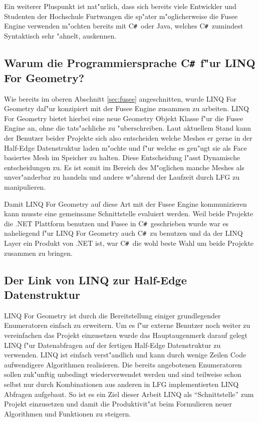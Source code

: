 \documentclass[pagesize, paper=a4, fontsize=12pt,titlepage=true, headings=small, headnosepline, abstractoff, liststotoc, nochapterprefix, plainheadsepline]{scrreprt}
\newcommand{\CSS}{C\texttt{\# }}
\newcommand{\LFG}{LINQ For Geometry}
\newcommand{\LFGS}{LINQ For Geometry }
\newcommand{\HES}{Half-Edge Datenstruktur }
\begin{document}
Ein weiterer Pluspunkt ist nat"urlich, dass sich bereits viele Entwickler und Studenten der Hochschule Furtwangen die sp"ater m"oglicherweise die Fusee Engine verwenden m"ochten bereits mit \CSS oder Java, welches \CSS zumindest Syntaktisch sehr "ahnelt, auskennen.
		\subsection {Warum die Programmiersprache \CSS f"ur \LFG?}
			Wie bereits im oberen Abschnitt \ref{sec:fusee} angeschnitten, wurde \LFGS daf"ur konzipiert mit der Fusee Engine zusammen zu arbeiten. \LFGS bietet hierbei eine neue Geometry Objekt Klasse f"ur die Fusee Engine an, ohne die tats"achliche zu "uberschreiben. Laut aktuellem Stand kann der Benutzer beider Projekte sich also entscheiden welche Meshes er gerne in der \HES laden m"ochte und f"ur welche es gen"ugt sie als Face basiertes Mesh im Speicher zu halten. Diese Entscheidung l"asst Dynamische entscheidungen zu. Es ist somit im Bereich des M"oglichen manche Meshes als unver"anderbar zu handeln und andere w"ahrend der Laufzeit durch LFG zu manipulieren.
\newline

Damit \LFGS auf diese Art mit der Fusee Engine kommunizieren kann musste eine gemeinsame Schnittstelle evaluiert werden. Weil beide Projekte die .NET Plattform benutzen und Fusee in \CSS geschrieben wurde war es naheliegend f"ur \LFGS auch \CSS zu benutzen und da der LINQ Layer ein Produkt von .NET ist, war \CSS die wohl beste Wahl um beide Projekte zusammen zu bringen.
\subsection {Der Link von LINQ zur \HES}
				\LFGS ist durch die Bereitstellung einiger grundlegender Enumeratoren einfach zu erweitern. Um es f"ur externe Benutzer noch weiter zu vereinfachen das Projekt einzusetzen wurde das Hauptaugenmerk darauf gelegt LINQ f"ur Datenabfragen auf der fertigen \HES zu verwenden. LINQ ist einfach verst"andlich und kann durch wenige Zeilen Code aufwendigere Algorithmen realisieren. Die bereits angebotenen Enumeratoren sollen zuk"unftig unbedingt wiederverwendet werden und sind teilweise schon selbst nur durch Kombinationen aus anderen in LFG implementierten LINQ Abfragen aufgebaut. So ist es ein Ziel dieser Arbeit LINQ als "`Schnittstelle"' zum Projekt einzusetzen und damit die Produktivit"at beim Formulieren neuer Algorithmen und Funktionen zu steigern.
\end{document}
